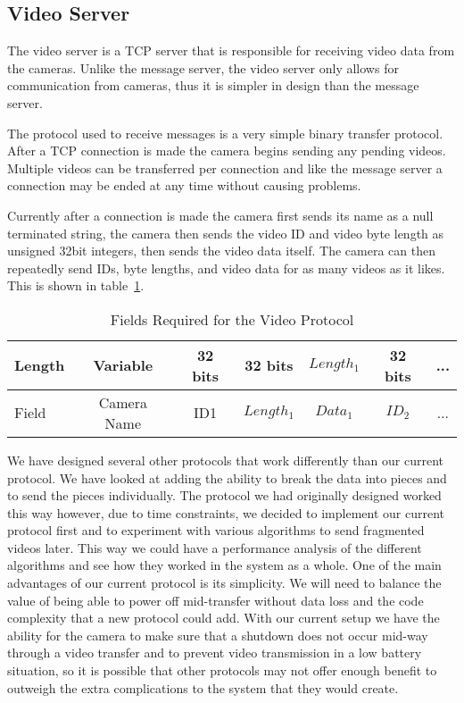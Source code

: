 
\subsection{Video Server}

The video server is a TCP server that is responsible for receiving video data
from the cameras. Unlike the message server, the video server only allows for
communication from cameras, thus it is simpler in design than the message
server.

The protocol used to receive messages is a very simple binary transfer protocol.
After a TCP connection is made the camera begins sending any pending videos.
Multiple videos can be transferred per connection and like the
message server a connection may be ended at any time without causing problems.

Currently after a connection is made the camera first sends its name as a null
terminated string, the camera then sends the video ID and video byte length as
unsigned 32bit integers, then sends the video data itself.  The camera can then
repeatedly send IDs, byte lengths, and video data for as many videos as it
likes. This is shown in table~\ref{video_protocol}.



\begin{table}[!t]
\renewcommand{\arraystretch}{1.3}
\caption{Fields Required for the Video Protocol}
\label{video_protocol}
\centering

\begin{tabular}{ | l || c | c | c | c | c | c |}
    \hline  
    Length & Variable & 32 bits & 32 bits & $Length_1$ & 32 bits & ...\\
    \hline                       
    Field & Camera Name & ID{1} & $Length_1$ & $Data_1$ & $ID_2$ & ...\\
    \hline  
\end{tabular}

\end{table}


We have designed several other protocols that work differently than our current
protocol. We have looked at adding the ability to break the data into pieces and
to send the pieces individually. The protocol we had originally designed worked
this way however, due to time constraints, we decided to implement our current
protocol first and to experiment with various algorithms to send fragmented
videos later. This way we could have a performance analysis of the different
algorithms and see how they worked in the system as a whole. One of the main
advantages of our current protocol is its simplicity. We will need to balance
the value of being able to power off mid-transfer without data loss and the code
complexity that a new protocol could add. With our current setup we have the
ability for the camera to make sure that a shutdown does not occur mid-way
through a video transfer and to prevent video transmission in a low battery
situation, so it is possible that other protocols may not offer enough benefit
to outweigh the extra complications to the system that they would create.

